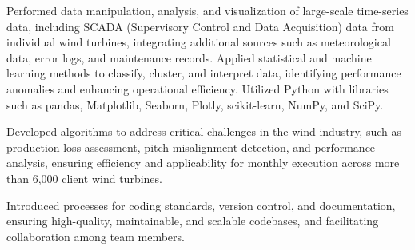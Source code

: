 \begin{tightemize}
    \item Performed data manipulation, analysis, and visualization of large-scale time-series data, including SCADA (Supervisory Control and Data Acquisition) data from individual wind turbines, integrating additional sources such as meteorological data, error logs, and maintenance records. Applied statistical and machine learning methods to classify, cluster, and interpret data, identifying performance anomalies and enhancing operational efficiency. Utilized Python with libraries such as pandas, Matplotlib, Seaborn, Plotly, scikit-learn, NumPy, and SciPy.

    \item Developed algorithms to address critical challenges in the wind industry, such as production loss assessment, pitch misalignment detection, and performance analysis, ensuring efficiency and applicability for monthly execution across more than 6,000 client wind turbines.

    \item Introduced processes for coding standards, version control, and documentation, ensuring high-quality, maintainable, and scalable codebases, and facilitating collaboration among team members.
\end{tightemize}